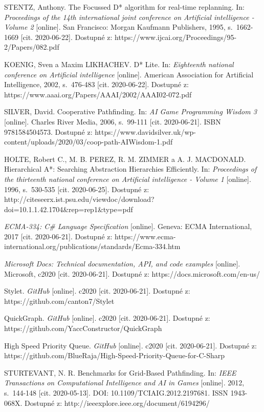 \begin{thebibliography}{99}
STENTZ, Anthony. The Focussed D* algorithm for real-time replanning. In: \textit{Proceedings of the 14th international joint conference on Artificial intelligence - Volume 2} [online]. San Francisco: Morgan Kaufmann Publishers, 1995, s.~1662-1669 [cit. 2020-06-22]. Dostupné z: https://www.ijcai.org/Proceedings/95-2/Papers/082.pdf

KOENIG, Sven a Maxim LIKHACHEV. D* Lite. In: \textit{Eighteenth national conference on Artificial intelligence} [online]. American Association for Artificial Intelligence, 2002, s.~476-483 [cit. 2020-06-22]. Dostupné z: https://www.aaai.org/Papers/AAAI/2002/AAAI02-072.pdf

SILVER, David. Cooperative Pathfinding. In: \textit{AI Game Programming Wisdom 3} [online]. Charles River Media, 2006, s.~99-111 [cit. 2020-06-21]. ISBN 9781584504573. Dostupné z: https://www.davidsilver.uk/wp-content/uploads/2020/03/coop-path-AIWisdom-1.pdf

HOLTE, Robert C., M. B. PEREZ, R. M. ZIMMER a A. J. MACDONALD. Hierarchical A*: Searching Abstraction Hierarchies Efficiently. In: \textit{Proceedings of the thirteenth national conference on Artificial intelligence - Volume 1} [online]. 1996, s.~530-535 [cit. 2020-06-25]. Dostupné z: http://citeseerx.ist.psu.edu/viewdoc/download?doi=10.1.1.42.1704\&rep=rep1\&type=pdf

\textit{ECMA-334: C\# Language Specification} [online]. Geneva: ECMA International, 2017 [cit. 2020-06-21]. Dostupné z: https://www.ecma-international.org/publications/standards/Ecma-334.htm

\textit{Microsoft Docs: Technical documentation, API, and code examples} [online]. Microsoft, c2020 [cit. 2020-06-21]. Dostupné z: https://docs.microsoft.com/en-us/

Stylet. \textit{GitHub} [online]. c2020 [cit. 2020-06-21]. Dostupné z: https://github.com/canton7/Stylet

QuickGraph. \textit{GitHub} [online]. c2020 [cit. 2020-06-21]. Dostupné z: https://github.com/YaccConstructor/QuickGraph

High Speed Priority Queue. \textit{GitHub} [online]. c2020 [cit. 2020-06-21]. Dostupné z: https://github.com/BlueRaja/High-Speed-Priority-Queue-for-C-Sharp

STURTEVANT, N. R. Benchmarks for Grid-Based Pathfinding. In: \textit{IEEE Transactions on Computational Intelligence and AI in Games} [online]. 2012, s.~144-148 [cit. 2020-05-13]. DOI: 10.1109/TCIAIG.2012.2197681. ISSN 1943-068X. Dostupné z: http://ieeexplore.ieee.org/document/6194296/











	


	
\end{thebibliography}
